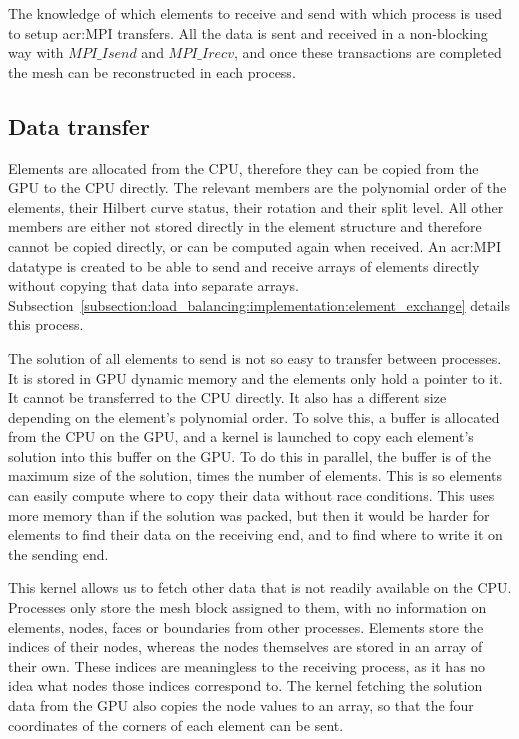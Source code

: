 The knowledge of which elements to receive and send with which process is used to setup
\acrshort{acr:MPI} transfers. All the data is sent and received in a non-blocking way with
$MPI\_Isend$ and $MPI\_Irecv$, and once these transactions are completed the mesh can be
reconstructed in each process.

\subsection{Data transfer} \label{subsection:load_balancing:reconstruction:data_transfer}

Elements are allocated from the CPU, therefore they can be copied from the GPU to the CPU directly.
The relevant members are the polynomial order of the elements, their Hilbert curve status, their
rotation and their split level. All other members are either not stored directly in the element
structure and therefore cannot be copied directly, or can be computed again when received. An
\acrshort{acr:MPI} datatype is created to be able to send and receive arrays of elements directly
without copying that data into separate arrays.
Subsection~\ref{subsection:load_balancing:implementation:element_exchange} details this process.

The solution of all elements to send is not so easy to transfer between processes. It is stored in
GPU dynamic memory and the elements only hold a pointer to it. It cannot be transferred to the CPU
directly. It also has a different size depending on the element's polynomial order. To solve this, a
buffer is allocated from the CPU on the GPU, and a kernel is launched to copy each element's
solution into this buffer on the GPU. To do this in parallel, the buffer is of the maximum size of
the solution, times the number of elements. This is so elements can easily compute where to copy
their data without race conditions. This uses more memory than if the solution was packed, but then
it would be harder for elements to find their data on the receiving end, and to find where to write
it on the sending end. 

This kernel allows us to fetch other data that is not readily available on the CPU. Processes only
store the mesh block assigned to them, with no information on elements, nodes, faces or boundaries
from other processes. Elements store the indices of their nodes, whereas the nodes themselves are
stored in an array of their own. These indices are meaningless to the receiving process, as it has
no idea what nodes those indices correspond to. The kernel fetching the solution data from the GPU
also copies the node values to an array, so that the four coordinates of the corners of each element
can be sent.

